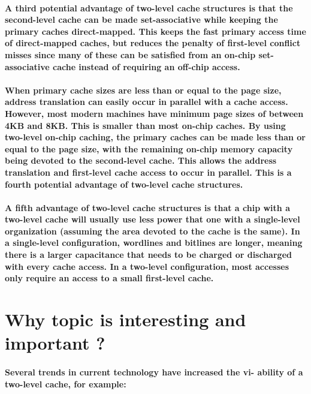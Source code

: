 \documentclass{article}
\begin{document}
\paragraph{A third potential advantage of two-level cache structures is that the second-level cache can be
made set-associative while keeping the primary caches direct-mapped. This keeps the fast
primary access time of direct-mapped caches, but reduces the penalty of first-level conflict
misses since many of these can be satisfied from an on-chip set-associative cache instead of
requiring an off-chip access.}

\paragraph{When primary cache sizes are less than or equal to the page size, address translation can easily
occur in parallel with a cache access. However, most modern machines have minimum page
sizes of between 4KB and 8KB. This is smaller than most on-chip caches. By using two-level
on-chip caching, the primary caches can be made less than or equal to the page size, with the
remaining on-chip memory capacity being devoted to the second-level cache. This allows the
address translation and first-level cache access to occur in parallel. This is a fourth potential advantage of 
two-level cache structures.}

\paragraph{A fifth advantage of two-level cache structures is that a chip with a two-level cache will
usually use less power that one with a single-level organization (assuming the area devoted to the
cache is the same). In a single-level configuration, wordlines and bitlines are longer, meaning
there is a larger capacitance that needs to be charged or discharged with every cache access. In a
two-level configuration, most accesses only require an access to a small first-level cache.}

\pagebreak

\section{Why topic is interesting and important ?}

\paragraph{Several trends in current technology have increased the vi-
ability of a two-level cache, for example:}
\end{document}
